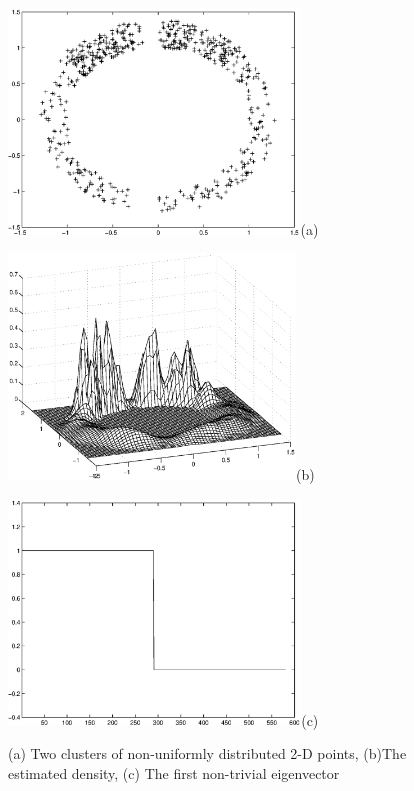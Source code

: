 \documentclass[12pt,letterpaper,doublespaced,ETD,dvips,proposal]{gtthesis}
\begin{document}
\begin{Body}
\begin{figure}[!htb]
 \centerline{\includegraphics[height=6.0cm]{fig2a.eps}(a)}
 \centerline{\includegraphics[height=6.0cm]{fig2b.eps}(b)}
 \centerline{\includegraphics[height=6.0cm]{fig2c.eps}(c)}
\caption{(a) Two clusters of non-uniformly distributed 2-D points,
(b)The estimated density, (c) The first non-trivial eigenvector
\vspace{1.2cm}}
  \label{fig2}
\end{figure}



\end{Body}
\end{document}

